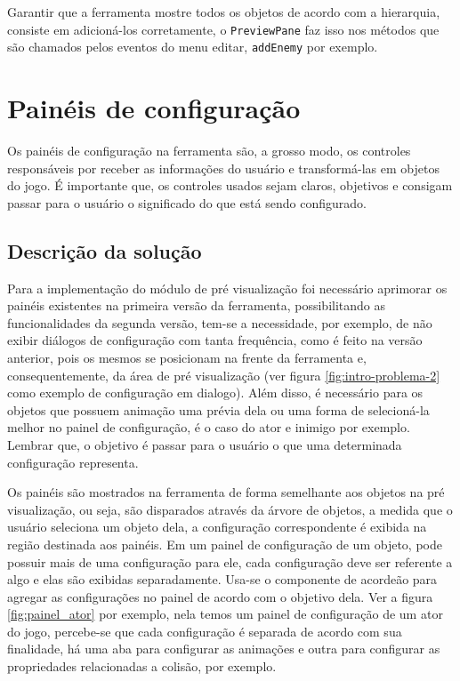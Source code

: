 \documentclass[12pt,twoside,openright,a4paper,english,brazil,sumario=tradicional]{abntex2}
\begin{document}
Garantir que a ferramenta mostre todos os objetos de acordo com a hierarquia, consiste em adicioná-los corretamente, o \texttt{PreviewPane} faz isso nos métodos que são chamados pelos eventos do menu editar, \texttt{addEnemy} por exemplo.

\section{Painéis de configuração}

Os painéis de configuração na ferramenta são, a grosso modo, os controles responsáveis por receber as informações do usuário e transformá-las em objetos do jogo.
É importante que, os controles usados sejam claros, objetivos e consigam passar para o usuário o significado do que está sendo configurado.

\subsection{Descrição da solução}
Para a implementação do módulo de pré visualização foi necessário aprimorar os painéis existentes na primeira versão da ferramenta, possibilitando as funcionalidades da segunda versão, tem-se a necessidade, por exemplo, de não exibir diálogos de configuração  com tanta frequência, como é feito na versão anterior, pois os mesmos se posicionam na frente da ferramenta  e, consequentemente, da área de pré visualização (ver figura \ref{fig:intro-problema-2} como exemplo de configuração em dialogo).
Além disso, é necessário para os objetos que possuem animação uma prévia dela ou uma forma de selecioná-la melhor no painel de configuração, é o caso do ator e inimigo por exemplo.
Lembrar que, o objetivo é passar para o usuário o que uma determinada configuração representa.

Os painéis são mostrados na ferramenta de forma semelhante aos objetos na pré visualização, ou seja, são disparados através da árvore de objetos, a medida que o usuário seleciona um objeto dela, a configuração correspondente é exibida na região destinada aos painéis.
Em um painel de configuração de um objeto, pode possuir mais de uma configuração para ele, cada configuração deve ser referente a algo e elas são exibidas separadamente.
Usa-se o componente de acordeão para agregar as configurações no painel de acordo com o objetivo dela. Ver a figura \ref{fig:painel_ator} por exemplo, nela temos um painel de configuração de um ator do jogo, percebe-se que cada configuração é separada de acordo com sua finalidade, há uma aba para configurar as animações e outra para configurar as propriedades relacionadas a colisão, por exemplo.
\end{document}
